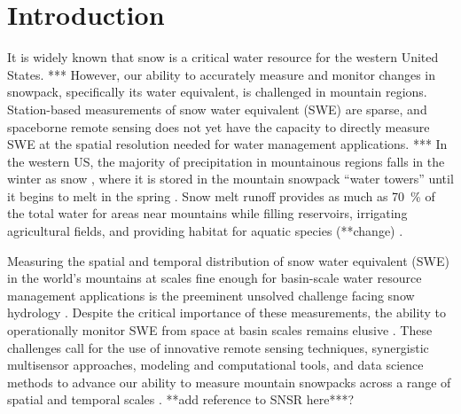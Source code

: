 
\hypertarget{ch1}{%
\chapter{Introduction}\label{ch1}}


It is widely known that snow is a critical water resource for the western United States. 
*** However, our ability to accurately measure and monitor changes in snowpack, specifically its water equivalent, is challenged in mountain regions. Station-based measurements of snow water equivalent (SWE) are sparse, and spaceborne remote sensing does not yet have the capacity to directly measure SWE at the spatial resolution needed for water management applications. ***
In the western US, the majority of precipitation in mountainous regions falls in the winter as snow \citep{serrezeCharacteristicsWesternUnited1999}, where it is stored in the mountain snowpack “water towers” until it begins to melt in the spring \citep{immerzeelImportanceVulnerabilityWorld2020,viviroliIncreasingDependenceLowland2020}. Snow melt runoff provides as much as 70~\% of the total water for areas near mountains \citep{liHowMuchRunoff2017} while filling reservoirs, irrigating agricultural fields, and providing habitat for aquatic species (**change) \citep{yarnellEcologyManagementSpring2010}. 

Measuring the spatial and temporal distribution of snow water equivalent (SWE) in the world’s mountains at scales fine enough for basin-scale water resource management applications is the preeminent unsolved challenge facing snow hydrology \citep{dozierEstimatingSpatialDistribution2016}. Despite the critical importance of these measurements, the ability to operationally monitor SWE from space at basin scales remains elusive \citep{lettenmaierInroadsRemoteSensing2015}. These challenges call for the use of innovative remote sensing techniques, synergistic multisensor approaches, modeling and computational tools, and data science methods to advance our ability to measure mountain snowpacks across a range of spatial and temporal scales \citep{dozierMountainHydrologySnow2011}. 
**add reference to SNSR here***?

